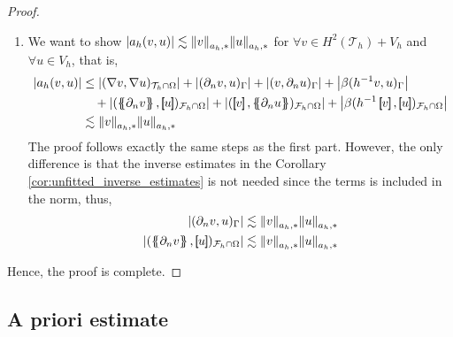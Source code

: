 \begin{proof}
\begin{enumerate}[label=\arabic*)]
\item We want to show $\left\lvert  a_{h}( v,u)  \right\rvert  \lesssim \| v \|_{ a_{h},* }^{  }  \| u \|_{ a_{h},* }^{  }$
for $ \forall v \in  H^{2}( \mathcal{T}_{h} ) + V_{h} $ and $ \forall u \in V_{h}$,
    that is,      \[
        \begin{split}
    \left\lvert a_{h}( v,u)  \right\rvert & \le  \left\lvert( \nabla v, \nabla u)_{\mathcal{T} _{h} \cap \Omega }  \right\rvert +  \left\lvert  ( \partial _{n} v,u)_{\Gamma } \right\rvert   + \left\lvert ( v, \partial _{n} u)_{\Gamma } \right\rvert  +
    \left\lvert\beta ( h^{-1} v,u)_{\Gamma }  \right\rvert  \\
    & \quad  + \left\lvert( \mean{ \partial _{n} v }  , \jump{ u }  ) _{\mathcal{F} _{h} \cap \Omega }  \right\rvert  + \left\lvert ( \jump{ v }  , \mean{ \partial _{n} u }  )_{\mathcal{F} _{h}\cap \Omega } \right\rvert  + \left\lvert \beta ( h^{-1} \jump{ v }  ,
    \jump{ u }  )_{\mathcal{F}_{h}\cap \Omega  } \right\rvert \\
     & \lesssim  \| v \|_{ a_{h},* }^{  }  \| u \|_{ a_{h},* }^{  }
        \end{split}
    \]
    The proof follows exactly the same steps as the first part. However, the only difference is that the inverse estimates in the Corollary \ref{cor:unfitted_inverse_estimates} is not needed since the terms is included in the norm, thus, \[
        \begin{split}
    \abs{ ( \partial _{n} v, u) _{\Gamma } } & \lesssim \| v \|_{ a_{h},* }^{  } \| u \|_{a_{h},*  }^{  } \\
    \abs{ ( \mean{ \partial _{n} v  }  , \jump{ u }  ) _{\mathcal{F} _{h} \cap \Omega  } } & \lesssim \| v \|_{ a_{h},* }^{  } \| u \|_{a_{h},*  }^{  }
        \end{split}
    \]

    \end{enumerate}

    Hence, the proof is complete.



\end{proof}

\subsection{A priori estimate}%
\label{sub:a_priori_estimate}

